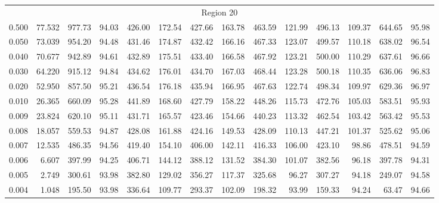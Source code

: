 \begin{tabular}{@{}lrrrrrrrrrrrrr@{}}
\midrule
\multicolumn{14}{c}{Region 20} \\
\cmidrule{1-14}
0.500 & 77.532 & 977.73 & 94.03 & 426.00 & 172.54 & 427.66 & 163.78 & 463.59 & 121.99 & 496.13 & 109.37 & 644.65 & 95.98 \\
0.050 & 73.039 & 954.20 & 94.48 & 431.46 & 174.87 & 432.42 & 166.16 & 467.33 & 123.07 & 499.57 & 110.18 & 638.02 & 96.54 \\
0.040 & 70.677 & 942.89 & 94.61 & 432.89 & 175.51 & 433.40 & 166.58 & 467.92 & 123.21 & 500.00 & 110.29 & 637.61 & 96.66 \\
0.030 & 64.220 & 915.12 & 94.84 & 434.62 & 176.01 & 434.70 & 167.03 & 468.44 & 123.28 & 500.18 & 110.35 & 636.06 & 96.83 \\
0.020 & 52.950 & 857.50 & 95.21 & 436.54 & 176.18 & 435.94 & 166.95 & 467.63 & 122.74 & 498.34 & 109.97 & 629.36 & 96.97 \\
0.010 & 26.365 & 660.09 & 95.28 & 441.89 & 168.60 & 427.79 & 158.22 & 448.26 & 115.73 & 472.76 & 105.03 & 583.51 & 95.93 \\
0.009 & 23.824 & 620.10 & 95.11 & 431.71 & 165.57 & 423.46 & 154.66 & 440.23 & 113.32 & 462.54 & 103.42 & 563.42 & 95.53 \\
0.008 & 18.057 & 559.53 & 94.87 & 428.08 & 161.88 & 424.16 & 149.53 & 428.09 & 110.13 & 447.21 & 101.37 & 525.62 & 95.06 \\
0.007 & 12.535 & 486.35 & 94.56 & 419.40 & 154.10 & 406.00 & 142.11 & 416.33 & 106.00 & 423.10 & 98.86 & 478.51 & 94.59 \\
0.006 & 6.607 & 397.99 & 94.25 & 406.71 & 144.12 & 388.12 & 131.52 & 384.30 & 101.07 & 382.56 & 96.18 & 397.78 & 94.31 \\
0.005 & 2.749 & 300.61 & 93.98 & 382.80 & 129.02 & 356.27 & 117.37 & 325.68 & 96.27 & 307.27 & 94.18 & 249.07 & 94.58 \\
0.004 & 1.048 & 195.50 & 93.98 & 336.64 & 109.77 & 293.37 & 102.09 & 198.32 & 93.99 & 159.33 & 94.24 & 63.47 & 94.66 \\

\bottomrule
\end{tabular}

